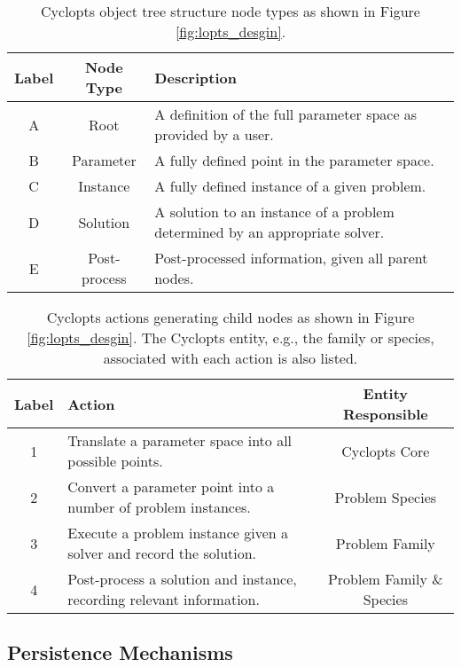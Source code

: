 \begin{table}[h!]
\centering
\caption{Cyclopts object tree structure node types as shown in Figure \ref{fig:lopts_desgin}.}
\label{tbl:lopts_nodes}
\begin{tabularx}{\columnwidth-10pt}{|c|c|X|} %
\hline
\textbf{Label}    & \textbf{Node Type} & \textbf{Description}
\\ \hline
A & Root & A definition of the full parameter space as provided by a user.
\\ \hline
B & Parameter & A fully defined point in the parameter space.
\\ \hline
C & Instance & A fully defined instance of a given problem.
\\ \hline
D & Solution & A solution to an instance of a problem determined by an appropriate solver.
\\ \hline
E & Post-process & Post-processed information, given all parent nodes.
\\ \hline
\end{tabularx}
\end{table}

\begin{table}[h!]
\centering
\caption{Cyclopts actions generating child nodes as shown in Figure
  \ref{fig:lopts_desgin}. The Cyclopts entity, e.g., the family or species,
  associated with each action is also listed.}
\label{tbl:lopts_actions}
\begin{tabularx}{\columnwidth-10pt}{|c|X|c|} %
\hline
\textbf{Label} & \textbf{Action} & \textbf{Entity Responsible}
\\ \hline
1 & Translate a parameter space into all possible points. & Cyclopts Core
\\ \hline
2 & Convert a parameter point into a number of problem instances. & Problem Species
\\ \hline
3 & Execute a problem instance given a solver and record the solution. & Problem Family
\\ \hline
4 & Post-process a solution and instance, recording relevant information. & Problem Family \& Species
\\ \hline
\end{tabularx}
\end{table}

\subsection{Persistence Mechanisms}\label{method:tools:hdf5}

